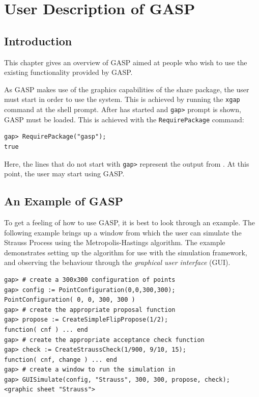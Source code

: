 \chapter{User Description of GASP}

\section{Introduction}

This chapter gives an overview of GASP aimed at people who wish
to use the existing functionality provided by GASP.

As GASP makes use of the graphics capabilities of the \XGAP{} share
package, the user must start \XGAP{} in order to use the system.  This
is achieved by running the \texttt{xgap} command at the shell prompt.
After \XGAP{} has started and \texttt{gap>} prompt is shown, GASP must
be loaded.  This is achieved with the \texttt{RequirePackage} command:
\begin{verbatim}
gap> RequirePackage("gasp");
true
\end{verbatim}

\noindent Here, the lines that do not start with \texttt{gap>}
represent the output from \GAP{}.  At this point, the user may start
using GASP.

\section{An Example of GASP}

To get a feeling of how to use GASP, it is best to look through an
example.  The following example brings up a window from which the user
can simulate the Strauss Process using the Metropolis-Hastings
algorithm.  The example demonstrates setting up the algorithm for use
with the simulation framework, and observing the behaviour through the
\emph{graphical user interface} (GUI).

\begin{verbatim}
gap> # create a 300x300 configuration of points
gap> config := PointConfiguration(0,0,300,300);
PointConfiguration( 0, 0, 300, 300 )
gap> # create the appropriate proposal function
gap> propose := CreateSimpleFlipPropose(1/2);
function( cnf ) ... end
gap> # create the appropriate acceptance check function
gap> check := CreateStraussCheck(1/900, 9/10, 15);
function( cnf, change ) ... end
gap> # create a window to run the simulation in
gap> GUISimulate(config, "Strauss", 300, 300, propose, check);
<graphic sheet "Strauss">
\end{verbatim}

